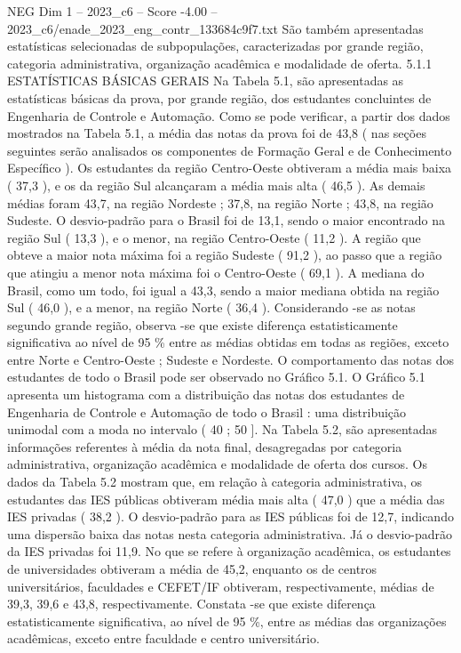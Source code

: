 \begin{textsample}{NEG Dim 1 – 2023\_c6 – Score -4.00 – 2023\_c6/enade\_2023\_eng\_contr\_133684c9f7.txt}
São também apresentadas estatísticas selecionadas de subpopulações, caracterizadas por grande região, categoria administrativa, organização acadêmica e modalidade de oferta. 5.1.1 ESTATÍSTICAS BÁSICAS GERAIS Na Tabela 5.1, são apresentadas as estatísticas básicas da prova, por grande região, dos estudantes concluintes de Engenharia de Controle e Automação.
Como se pode verificar, a partir dos dados mostrados na Tabela 5.1, a média das notas da prova foi de 43,8 ( nas seções seguintes serão analisados os componentes de Formação Geral e de Conhecimento Específico ).
Os estudantes da região Centro-Oeste obtiveram a média mais baixa ( 37,3 ), e os da região Sul alcançaram a média mais alta ( 46,5 ).
As demais médias foram 43,7, na região Nordeste ; 37,8, na região Norte ; 43,8, na região Sudeste.
O desvio-padrão para o Brasil foi de 13,1, sendo o maior encontrado na região Sul ( 13,3 ), e o menor, na região Centro-Oeste ( 11,2 ).
A região que obteve a maior nota máxima foi a região Sudeste ( 91,2 ), ao passo que a região que atingiu a menor nota máxima foi o Centro-Oeste ( 69,1 ).
A mediana do Brasil, como um todo, foi igual a 43,3, sendo a maior mediana obtida na região Sul ( 46,0 ), e a menor, na região Norte ( 36,4 ).
Considerando -se as notas segundo grande região, observa -se que existe diferença estatisticamente significativa ao nível de 95 \% entre as médias obtidas em todas as regiões, exceto entre Norte e Centro-Oeste ; Sudeste e Nordeste.
O comportamento das notas dos estudantes de todo o Brasil pode ser observado no Gráfico 5.1.
O Gráfico 5.1 apresenta um histograma com a distribuição das notas dos estudantes de Engenharia de Controle e Automação de todo o Brasil : uma distribuição unimodal com a moda no intervalo ( 40 ; 50 ].
Na Tabela 5.2, são apresentadas informações referentes à média da nota final, desagregadas por categoria administrativa, organização acadêmica e modalidade de oferta dos cursos.
Os dados da Tabela 5.2 mostram que, em relação à categoria administrativa, os estudantes das IES públicas obtiveram média mais alta ( 47,0 ) que a média das IES privadas ( 38,2 ).
O desvio-padrão para as IES públicas foi de 12,7, indicando uma dispersão baixa das notas nesta categoria administrativa.
Já o desvio-padrão da IES privadas foi 11,9.
No que se refere à organização acadêmica, os estudantes de universidades obtiveram a média de 45,2, enquanto os de centros universitários, faculdades e CEFET/IF obtiveram, respectivamente, médias de 39,3, 39,6 e 43,8, respectivamente.
Constata -se que existe diferença estatisticamente significativa, ao nível de 95 \%, entre as médias das organizações acadêmicas, exceto entre faculdade e centro universitário.

\end{textsample}
